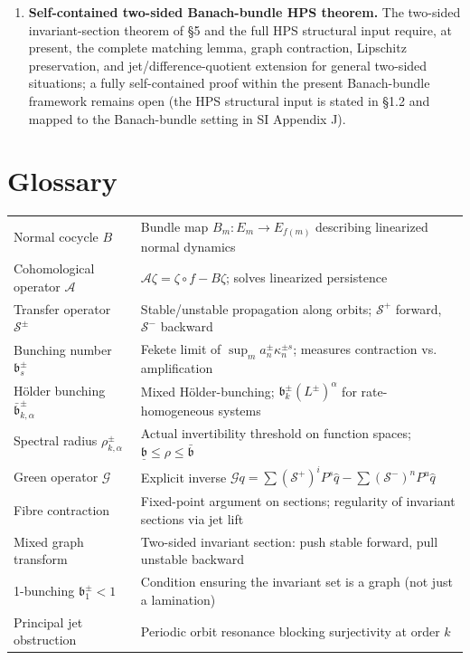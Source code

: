 \documentclass[11pt,a4paper]{article}
\theoremstyle{plain}
\theoremstyle{definition}
\theoremstyle{remark}
\numberwithin{equation}{section}
\numberwithin{figure}{section}
\begin{document}
\begin{enumerate}
    \item \textbf{Self-contained two-sided Banach-bundle HPS theorem.} The two-sided invariant-section theorem of §5 and the full HPS structural input require, at present, the complete matching lemma, graph contraction, Lipschitz preservation, and jet/difference-quotient extension for general two-sided situations; a fully self-contained proof within the present Banach-bundle framework remains open (the HPS structural input is stated in §1.2 and mapped to the Banach-bundle setting in SI Appendix J).
\end{enumerate}

\section*{Glossary}

\begin{tabular}{l|l}
Normal cocycle $B$ & Bundle map $B_m:E_m\to E_{f(m)}$ describing linearized normal dynamics \\
Cohomological operator $\mathcal A$ & $\mathcal A\zeta = \zeta\circ f - B\zeta$; solves linearized persistence \\
Transfer operator $\mathcal S^\pm$ & Stable/unstable propagation along orbits; $\mathcal S^+$ forward, $\mathcal S^-$ backward \\
Bunching number $\mathfrak b^\pm_s$ & Fekete limit of $\sup_m a_n^\pm \kappa_n^{\pm s}$; measures contraction vs. amplification \\
Hölder bunching $\bar{\mathfrak b}^\pm_{k,\alpha}$ & Mixed Hölder-bunching; $\mathfrak b^\pm_k(L^\pm)^\alpha$ for rate-homogeneous systems \\
Spectral radius $\rho^\pm_{k,\alpha}$ & Actual invertibility threshold on function spaces; $\underline{\mathfrak b}\le\rho\le\bar{\mathfrak b}$ \\
Green operator $\mathcal G$ & Explicit inverse $\mathcal Gq=\sum(\mathcal S^+)^iP^s\hat q-\sum(\mathcal S^-)^nP^u\hat q$ \\
Fibre contraction & Fixed-point argument on sections; regularity of invariant sections via jet lift \\
Mixed graph transform & Two-sided invariant section: push stable forward, pull unstable backward \\
1-bunching $\mathfrak b_1^\pm<1$ & Condition ensuring the invariant set is a graph (not just a lamination) \\
Principal jet obstruction & Periodic orbit resonance blocking surjectivity at order $k$ \\
\end{tabular}
\end{document}

